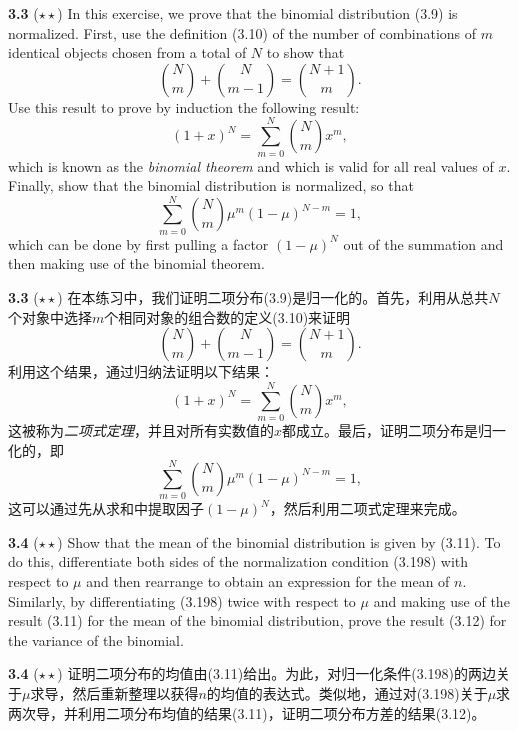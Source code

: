 \documentclass{article}
\begin{document}
\textbf{3.3} ($\star\star$) In this exercise, we prove that the binomial distribution (3.9) is normalized. First, use the definition (3.10) of the number of combinations of $m$ identical objects chosen from a total of $N$ to show that
\begin{equation}
\binom{N}{m} + \binom{N}{m-1} = \binom{N+1}{m}. \tag{3.196}
\end{equation}
Use this result to prove by induction the following result:
\begin{equation}
(1+x)^N = \sum_{m=0}^{N} \binom{N}{m} x^m, \tag{3.197}
\end{equation}
which is known as the \emph{binomial theorem} and which is valid for all real values of $x$. Finally, show that the binomial distribution is normalized, so that
\begin{equation}
\sum_{m=0}^{N} \binom{N}{m} \mu^m (1-\mu)^{N-m} = 1, \tag{3.198}
\end{equation}
which can be done by first pulling a factor $(1-\mu)^N$ out of the summation and then making use of the binomial theorem.

\textbf{3.3} ($\star\star$) 在本练习中，我们证明二项分布(3.9)是归一化的。首先，利用从总共$N$个对象中选择$m$个相同对象的组合数的定义(3.10)来证明
\begin{equation}
\binom{N}{m} + \binom{N}{m-1} = \binom{N+1}{m}. \tag{3.196}
\end{equation}
利用这个结果，通过归纳法证明以下结果：
\begin{equation}
(1+x)^N = \sum_{m=0}^{N} \binom{N}{m} x^m, \tag{3.197}
\end{equation}
这被称为\emph{二项式定理}，并且对所有实数值的$x$都成立。最后，证明二项分布是归一化的，即
\begin{equation}
\sum_{m=0}^{N} \binom{N}{m} \mu^m (1-\mu)^{N-m} = 1, \tag{3.198}
\end{equation}
这可以通过先从求和中提取因子$(1-\mu)^N$，然后利用二项式定理来完成。

\textbf{3.4} ($\star\star$) Show that the mean of the binomial distribution is given by (3.11). To do this, differentiate both sides of the normalization condition (3.198) with respect to $\mu$ and then rearrange to obtain an expression for the mean of $n$. Similarly, by differentiating (3.198) twice with respect to $\mu$ and making use of the result (3.11) for the mean of the binomial distribution, prove the result (3.12) for the variance of the binomial.

\textbf{3.4} ($\star\star$) 证明二项分布的均值由(3.11)给出。为此，对归一化条件(3.198)的两边关于$\mu$求导，然后重新整理以获得$n$的均值的表达式。类似地，通过对(3.198)关于$\mu$求两次导，并利用二项分布均值的结果(3.11)，证明二项分布方差的结果(3.12)。
\end{document}
